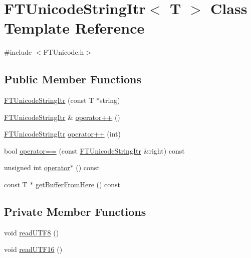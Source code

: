 \hypertarget{class_f_t_unicode_string_itr}{}\section{F\+T\+Unicode\+String\+Itr$<$ T $>$ Class Template Reference}
\label{class_f_t_unicode_string_itr}


{\ttfamily \#include $<$F\+T\+Unicode.\+h$>$}

\subsection*{Public Member Functions}
\begin{DoxyCompactItemize}
\item 
\hyperlink{class_f_t_unicode_string_itr_ab640405eaa904f1609f1b659e5657989}{F\+T\+Unicode\+String\+Itr} (const T $\ast$string)
\item 
\hyperlink{class_f_t_unicode_string_itr}{F\+T\+Unicode\+String\+Itr} \& \hyperlink{class_f_t_unicode_string_itr_a476aa8e48d5ea56de9ee979af1cd4007}{operator++} ()
\item 
\hyperlink{class_f_t_unicode_string_itr}{F\+T\+Unicode\+String\+Itr} \hyperlink{class_f_t_unicode_string_itr_a84c9354998144c4f221cde699e3f8455}{operator++} (int)
\item 
bool \hyperlink{class_f_t_unicode_string_itr_ae27e7162e014fbcbf731a50bd34b2946}{operator==} (const \hyperlink{class_f_t_unicode_string_itr}{F\+T\+Unicode\+String\+Itr} \&right) const 
\item 
unsigned int \hyperlink{class_f_t_unicode_string_itr_a90300d6888d77e7a349b0d476a7c0bb4}{operator$\ast$} () const 
\item 
const T $\ast$ \hyperlink{class_f_t_unicode_string_itr_a8ced99f40fd1af46e0a76b844187efe1}{get\+Buffer\+From\+Here} () const 
\end{DoxyCompactItemize}
\subsection*{Private Member Functions}
\begin{DoxyCompactItemize}
\item 
void \hyperlink{class_f_t_unicode_string_itr_a1d09b0a44b48e4b4b7dd30553534af73}{read\+U\+T\+F8} ()
\item 
void \hyperlink{class_f_t_unicode_string_itr_ac28b26f1bd06a0e1b56881f1ddf79f67}{read\+U\+T\+F16} ()
\end{DoxyCompactItemize}
